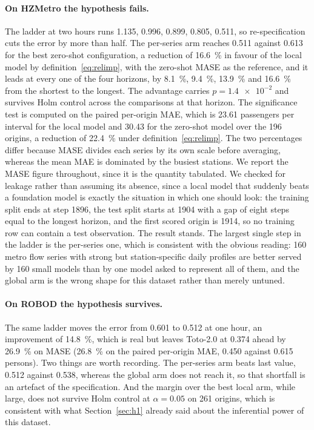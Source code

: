 \documentclass[utf8]{FrontiersinHarvard}
\newif\ifrevisionmarkup
\newcommand{\new}[1]{\ifrevisionmarkup\textcolor{revision}{#1}\else#1\fi}
\newif\ifsecondrevisionmarkup
\newcommand{\rev}[1]{\ifsecondrevisionmarkup\textcolor{revisiontwo}{#1}\else#1\fi}
\theoremstyle{plain}
\theoremstyle{definition}
\theoremstyle{remark}
\begin{document}
\new{\paragraph{On HZMetro the hypothesis fails.} The ladder at two hours runs \num{1.135}, \num{0.996}, \num{0.899}, \num{0.805}, \num{0.511}, so re-specification cuts the error by more than half. The per-series arm reaches \num{0.511} against \num{0.613} for the best zero-shot configuration, \rev{a reduction of \SI{16.6}{\percent} in favour of the local model by definition~\eqref{eq:relimp}, with the zero-shot MASE as the reference}, and it leads at every one of the four horizons\rev{, by \SI{8.1}{\percent}, \SI{9.4}{\percent}, \SI{13.9}{\percent} and \SI{16.6}{\percent} from the shortest to the longest}. The advantage carries $p=\num{1.4e-2}$ and survives Holm control across the comparisons at that horizon. \rev{The significance test is computed on the paired per-origin MAE, which is \num{23.61} passengers per interval for the local model and \num{30.43} for the zero-shot model over the \num{196} origins, a reduction of \SI{22.4}{\percent} under definition~\eqref{eq:relimp}. The two percentages differ because MASE divides each series by its own scale before averaging, whereas the mean MAE is dominated by the busiest stations. We report the MASE figure throughout, since it is the quantity tabulated.} We checked for leakage rather than assuming its absence, since a local model that suddenly beats a foundation model is exactly the situation in which one should look: the training split ends at step \num{1896}, the test split starts at \num{1904} with a gap of eight steps equal to the longest horizon, and the first scored origin is \num{1914}, so no training row can contain a test observation. The result stands. The largest single step in the ladder is the per-series one, which is consistent with the obvious reading: \num{160} metro flow series with strong but station-specific daily profiles are better served by \num{160} small models than by one model asked to represent all of them, and the global arm \rev{is} the wrong shape for this dataset rather than merely untuned.}

\new{\paragraph{On ROBOD the hypothesis survives.} The same ladder moves the error from \num{0.601} to \num{0.512} at one hour, an improvement of \SI{14.8}{\percent}, which is real but leaves Toto-2.0 at \num{0.374} ahead by \rev{\SI{26.9}{\percent} on MASE (\SI{26.8}{\percent} on the paired per-origin MAE, \num{0.450} against \num{0.615} persons)}. Two things are worth recording. The per-series arm beats last value, \num{0.512} against \num{0.538}, \rev{whereas the global arm does not reach it, so that shortfall is an artefact of the specification}. And the margin over the best local arm, while large, \rev{does not survive} Holm control at $\alpha = 0.05$ on \num{261} origins, which is consistent with what Section~\ref{sec:h1} already said about the inferential power of this dataset.}
\end{document}
